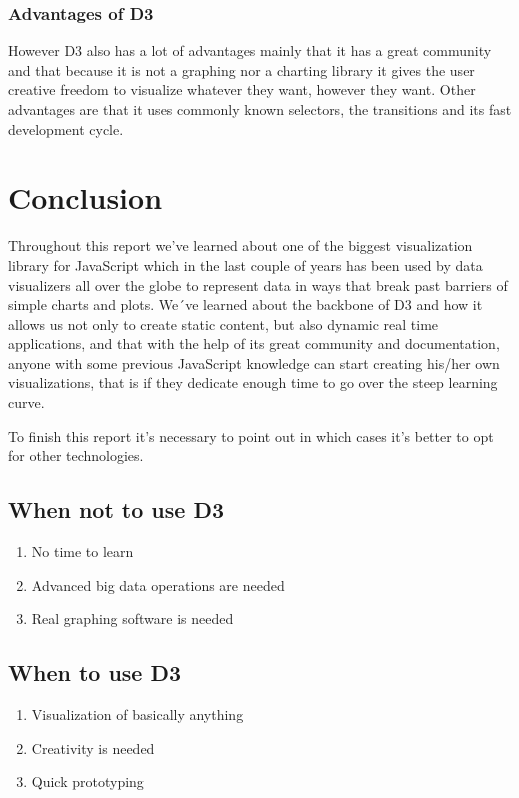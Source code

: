 \documentclass{bioinfo}
\begin{document}
\subsubsection{Advantages of D3}
\hfill \break
However D3 also has a lot of advantages mainly that it has a great community and that because it is not a graphing nor a charting library it gives the user creative freedom to visualize whatever they want, however they want. Other advantages are that it uses commonly known selectors, the transitions and its fast development cycle.


\section{Conclusion}
Throughout this report we’ve learned about one of the biggest visualization library for JavaScript which in the last couple of years has been used by data visualizers all over the globe to represent data in ways that break past barriers of simple charts and plots.
We´ve learned about the backbone of D3 and how it allows us not only to create static content, but also dynamic real time applications, and that with the help of its great community and documentation, anyone with some previous JavaScript knowledge can start creating his/her own visualizations, that is if they dedicate enough time to go over the steep learning curve.

To finish this report it’s necessary to point out in which cases it’s better to opt for other technologies.

\subsection{When not to use D3}
\hfill \break
\begin{enumerate}
\item No time to learn
\item Advanced big data operations are needed
\item Real graphing software is needed
\end{enumerate}

\subsection{When to use D3}
\hfill \break
\begin{enumerate}
\item Visualization of basically anything
\item Creativity is needed
\item Quick prototyping
\end{enumerate}
\end{document}
